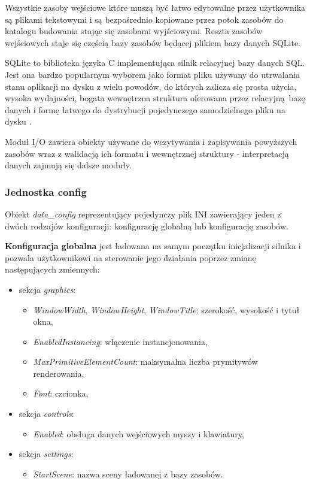 Wszystkie zasoby wejściowe które muszą być łatwo edytowalne przez użytkownika są plikami tekstowymi i są bezpośrednio kopiowane przez potok zasobów do katalogu budowania stając się zasobami wyjściowymi.
Reszta zasobów wejściowych staje się częścią bazy zasobów będącej plikiem bazy danych SQLite.

SQLite \cite{SQLITE} to biblioteka języka C implementująca silnik relacyjnej bazy danych SQL.
Jest ona bardzo popularnym wyborem jako format pliku używany do utrwalania stanu aplikacji na dysku z wielu powodów, do których zalicza się prosta użycia, wysoka wydajności, bogata wewnętrzna struktura oferowana przez relacyjną bazę danych i formę łatwego do dystrybucji pojedynczego samodzielnego pliku na dysku \cite{SQLITEAPPFORMAT}.

Moduł I/O zawiera obiekty używane do wczytywania i zapisywania powyższych zasobów wraz z walidacją ich formatu i wewnętrznej struktury - interpretacją danych zajmują się dalsze moduły.

\subsubsection{Jednostka config}
Obiekt \textit{data\_config} reprezentujący pojedynczy plik INI zawierający jeden z dwóch rodzajów konfiguracji: konfigurację globalną lub konfigurację zasobów.

\textbf{Konfiguracja globalna} jest ładowana na samym początku inicjalizacji silnika i pozwala użytkownikowi na sterowanie jego działania poprzez zmianę następujących zmiennych:
\begin{itemize}
	\item sekcja \textit{graphics}:
	\begin{itemize}
		\item \textit{WindowWidth}, \textit{WindowHeight}, \textit{WindowTitle}: szerokość, wysokość i tytuł okna,
		\item \textit{EnabledInstancing}: włączenie instancjonowania,
		\item \textit{MaxPrimitiveElementCount}: maksymalna liczba prymitywów renderowania,
		\item \textit{Font}: czcionka,
	\end{itemize}
	\item sekcja \textit{controls}:
	\begin{itemize}
		\item \textit{Enabled}: obsługa danych wejściowych myszy i klawiatury,
	\end{itemize}
	\item sekcja \textit{settings}:
	\begin{itemize}
		\item \textit{StartScene}: nazwa sceny ładowanej z bazy zasobów.
	\end{itemize}
\end{itemize}


